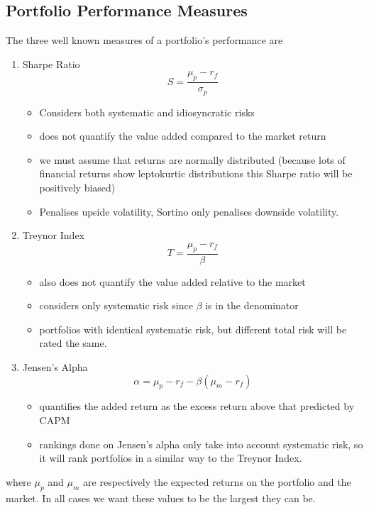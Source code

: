 \documentclass[11pt]{article}
\begin{document}
\subsection{Portfolio Performance Measures}

The three well known measures of a portfolio's performance are
\begin{enumerate}
    \item Sharpe Ratio
        \[S = \dfrac{\mu_p - r_f}{\sigma_p}\]

        \begin{itemize}
            \item Considers both systematic and idiosyncratic risks
            \item does not quantify the value added compared to the market return
            \item we must assume that returns are normally distributed (because lots of financial returns show leptokurtic distributions this Sharpe ratio will be positively biased)
            \item Penalises upside volatility, Sortino only penalises downside volatility.
        \end{itemize}

    \item Treynor Index
        \[T = \dfrac{\mu_p - r_f}{\beta}\]

        \begin{itemize}
            \item also does not quantify the value added relative to the market
            \item considers only systematic risk since $\beta$ is in the denominator
            \item portfolios with identical systematic risk, but different total risk will be rated the same.
        \end{itemize}

    \item Jensen's Alpha
        \[\alpha = \mu_p - r_f -\beta(\mu_m - r_f)\]

        \begin{itemize}
            \item quantifies the added return as the excess return above that predicted by CAPM
            \item rankings done on Jensen's alpha only take into account systematic risk, so it will rank portfolios in a similar way to the Treynor Index.
        \end{itemize}
\end{enumerate}
where $\mu_p$ and $\mu_m$ are respectively the expected returns on the portfolio and the market. In all cases we want these values to be the largest they can be.
\end{document}
